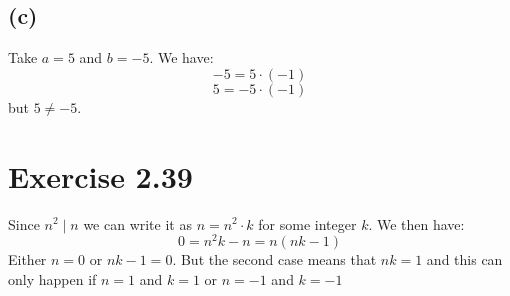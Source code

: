 \documentclass{article}
\begin{document}
\subsection*{(c)}

Take \(a = 5\) and \(b = -5\). We have:
\begin{equation*}
	-5 = 5 \cdot (-1)
\end{equation*}
\begin{equation*}
	5 = -5 \cdot (-1)
\end{equation*}
but \(5 \neq -5\). 

\section*{Exercise 2.39}
Since \(n^2 \mid n\) we can write it as \(n = n^2 \cdot k\) for some integer
\(k\). We then have:
\begin{equation*}
	0 = n^{2}k - n = n(nk - 1)
\end{equation*}
Either \(n = 0\) or \(nk - 1 = 0\). But the second case means that \(nk = 1\) and this can
only happen if \(n = 1\) and \(k = 1\) or  \(n = -1\) and \(k = -1\)
\end{document}
